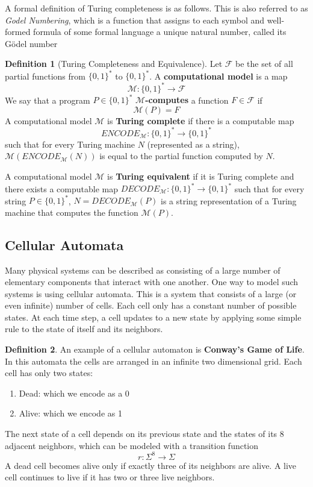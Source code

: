 \documentclass[a4paper, 12pt]{report}
\theoremstyle{remark}
\theoremstyle{definition}
\newtheorem{definition}{Definition}[section]
\begin{document}
A formal definition of Turing completeness is as follows. This is also referred to as \textit{Godel Numbering}, which is a function that assigns to each symbol and well-formed formula of some formal language a unique natural number, called its Gödel number 

\begin{definition}[Turing Completeness and Equivalence]
Let $\mathcal{F}$ be the set of all partial functions from $\{0, 1\}^*$ to $\{0,1\}^*$. A \textbf{computational model} is a map
\[\mathcal{M}: \{0,1\}^* \longrightarrow \mathcal{F}\]
We say that a program $P \in \{0,1\}^*$ \textbf{$\mathcal{M}$-computes} a function $F \in \mathcal{F}$ if 
\[\mathcal{M}(P) = F\]
A computational model $\mathcal{M}$ is \textbf{Turing complete} if there is a computable map 
\[ENCODE_{\mathcal{M}} : \{0,1\}^* \longrightarrow \{0,1\}^*\]
such that for every Turing machine $N$ (represented as a string), $\mathcal{M}(ENCODE_\mathcal{M} (N))$ is equal to the partial function computed by $N$. 

A computational model $\mathcal{M}$ is \textbf{Turing equivalent} if it is Turing complete and there exists a computable map $DECODE_\mathcal{M}: \{0,1\}^* \longrightarrow \{0,1\}^*$ such that for every string $P \in \{0,1\}^*$, $N = DECODE_\mathcal{M} (P)$ is a string representation of a Turing machine that computes the function $\mathcal{M}(P)$. 
\end{definition} 

\subsection{Cellular Automata}
Many physical systems can be described as consisting of a large number of elementary components that interact with one another. One way to model such systems is using cellular automata. This is a system that consists of a large (or even infinite) number of cells. Each cell only has a constant number of possible states. At each time step, a cell updates to a new state by applying some simple rule to the state of itself and its neighbors.

\begin{definition}
An example of a cellular automaton is \textbf{Conway's Game of Life}. In this automata the cells are arranged in an infinite two dimensional grid. Each cell has only two states: 
\begin{enumerate}
    \item Dead: which we encode as a 0
    \item Alive: which we encode as 1
\end{enumerate}
The next state of a cell depends on its previous state and the states of its 8 adjacent neighbors, which can be modeled with a transition function
\[r: \Sigma^8 \longrightarrow \Sigma\]
A dead cell becomes alive only if exactly three of its neighbors are alive. A live cell continues to live if it has two or three live neighbors. 
\end{definition}
\end{document}

